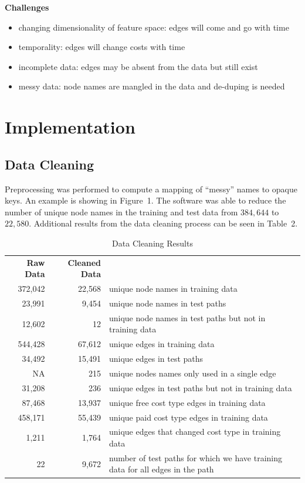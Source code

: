 \documentclass{article} %
\begin{document}
\textbf{Challenges}
\begin{itemize}
\item changing dimensionality of feature space: edges will come and go with time
\item temporality: edges will change costs with time
\item incomplete data: edges may be absent from the data but still exist
\item messy data: node names are mangled in the data and de-duping is needed
\end{itemize}

\section{Implementation}

\subsection{Data Cleaning}

Preprocessing was performed to compute a mapping of ``messy'' names to
opaque keys.  An example is showing in Figure~1.  The software was able to reduce the number of unique node
names in the training and test data from $384,644$ to $22,580$.  Additional
results from the data cleaning process can be seen in Table~2.

\begin{table}
\begin{tabular}{rrl} 
\textbf{Raw Data} & \textbf{Cleaned Data} & \\
372,042 & 22,568 & unique node names in training data \\ 
23,991 & 9,454 & unique node names in test paths\\
12,602 & 12 & unique node names in test paths but not in training data\\
544,428 & 67,612 & unique edges in training data \\
34,492 & 15,491 & unique edges in test paths \\
NA & 215 & unique nodes names only used in a single edge \\
31,208 & 236 & unique edges in test paths but not in training data \\
87,468 & 13,937 & unique free cost type edges in training data \\
458,171 & 55,439 & unique paid cost type edges in training data \\
1,211 & 1,764 & unique edges that changed cost type in training data \\
22 & 9,672 & number of test paths for which we have training data for all edges
in the path \\
\end{tabular}
\caption{Data Cleaning Results}
\end{table}
\end{document}
